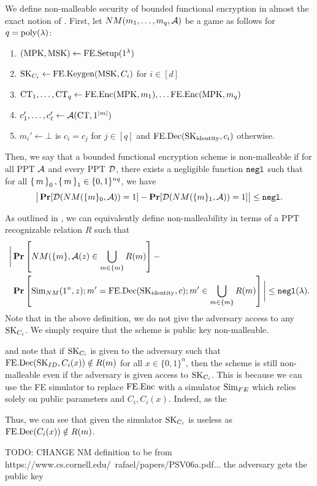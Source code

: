 We define non-malleable security of bounded functional encryption in almost the exact
notion of \cite{PassNM}. First,
let $NM(m_1, \dots, m_q, \mathcal{A})$ be a game as follows for $q = \operatorname{poly}(\lambda)$:
\begin{enumerate}
	\item $(\text{MPK}, \text{MSK}) \gets \text{FE.Setup}(1^\lambda)$
	\item $\text{SK}_{C_i} \gets \text{FE.Keygen}(\text{MSK}, C_i)$ for $i \in [d]$
	\item $\text{CT}_1, \dots, \text{CT}_q \gets \text{FE.Enc}(\text{MPK}, m_1), \dots \text{FE.Enc}(\text{MPK}, m_q)$
	\item $c_1', \dots, c_\ell' \gets \mathcal{A}(\text{CT}, 1^{|m|})$
	\item $m_i' \gets \bot$ is $c_i = c_j$ for $j \in [q]$ and $\text{FE.Dec}(\text{SK}_{\text{identity}}, c_i)$ otherwise.
\end{enumerate}
Then, we say that a bounded functional encryption scheme is non-malleable if for all PPT $\mathcal{A}$
and every PPT $\mathcal{D}$, there exists a negligible function $\texttt{negl}$ such that
for all $\set{m}_0, \set{m}_1 \in \{0, 1\}^{nq}$, we have
\begin{equation}
	\big|\operatorname*{\mathbf{Pr}}[\mathcal{D}(NM(\{m\}_0, \mathcal{A})) = 1] - \operatorname*{\mathbf{Pr}}[\mathcal{D}(NM(\{m\}_1 , \mathcal{A})) = 1] \big|\leq \texttt{negl}.
\end{equation}

As outlined in \cite{PassNM}, we can equivalently define non-malleability in terms of a PPT recognizable relation $R$
such that
\begin{align*}
	\label{eq:NMRel}
	\bigg|\operatorname*{\mathbf{Pr}}&\left[NM(\{m\} , \mathcal{A}(z) \in \bigcup_{m \in \{m\}} R(m)\right]- \\
				\operatorname*{\mathbf{Pr}}&\left[\text{Sim}_{NM}(1^n, z); m' = \text{FE.Dec}(\text{SK}_{\text{identity}}, c); m' \in \bigcup_{m \in \{m\}} R(m)\right]\bigg| \leq \texttt{negl}(\lambda).
\end{align*}
Note that in the above definition, we do not give the adversary access to any $\text{SK}_{C_i}$.
We simply require that the scheme is public key non-malleable.

and note that
if $\text{SK}_{C_i}$ is given to the adversary such that $\text{FE.Dec}(\text{SK}_{ID}, C_i(x)) \notin R(m)$ for all $x \in \{0, 1\}^n$,
then the scheme is still non-malleable even if the adversary is given access to $\text{SK}_{C_i}$.
This is because we can use the FE simulator to replace $\text{FE.Enc}$ with a simulator $\text{Sim}_{FE}$ which relies
solely on public parameters and $C_i, C_i(x)$. Indeed, as the 

Thus, we can see that given the simulator $\text{SK}_{C_i}$ is useless
as $\text{FE.Dec}(C_i(x)) \notin R(m)$.

TODO: CHANGE NM definition to be from https://www.cs.cornell.edu/~rafael/papers/PSV06a.pdf...
the adversary gets the public key



